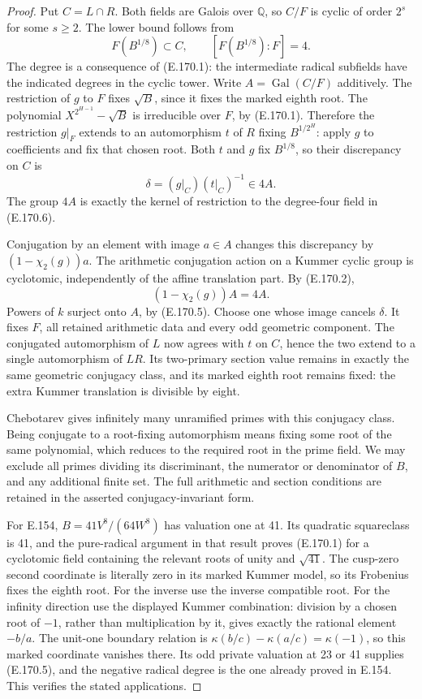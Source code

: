 \begin{proof}
Put \(C=L\cap R\). Both fields are Galois over \(\mathbb Q\),
so \(C/F\) is cyclic of order \(2^s\) for some \(s\ge2\).
The lower bound follows from
\[
          F(B^{1/8})\subset C,\qquad
          [F(B^{1/8}):F]=4.
 \tag{E.170.6}
\]
The degree is a consequence of (E.170.1): the intermediate
radical subfields have the indicated degrees in the cyclic tower.
Write \(A=\operatorname{Gal}(C/F)\) additively.
The restriction of \(g\) to \(F\) fixes \(\sqrt B\), since it
fixes the marked eighth root. The polynomial
\(X^{2^{H-1}}-\sqrt B\) is irreducible over \(F\), by
(E.170.1). Therefore the restriction \(g|_F\) extends to an
automorphism \(t\) of \(R\) fixing \(B^{1/2^H}\): apply
\(g\) to coefficients and fix that chosen root. Both \(t\)
and \(g\) fix \(B^{1/8}\), so their discrepancy on \(C\) is
\[
             \delta=(g|_C)(t|_C)^{-1}\in4A.
 \tag{E.170.7}
\]
The group \(4A\) is exactly the kernel of restriction to the
degree-four field in (E.170.6).

Conjugation by an element with image \(a\in A\) changes this
discrepancy by \((1-\chi_2(g))a\). The arithmetic conjugation
action on a Kummer cyclic group is cyclotomic, independently of
the affine translation part. By (E.170.2),
\[
                 (1-\chi_2(g))A=4A.
 \tag{E.170.8}
\]
Powers of \(k\) surject onto \(A\), by (E.170.5). Choose one
whose image cancels \(\delta\). It fixes \(F\), all retained
arithmetic data and every odd geometric component. The conjugated
automorphism of \(L\) now agrees with \(t\) on \(C\), hence
the two extend to a single automorphism of \(LR\). Its
two-primary section value remains in exactly the same geometric
conjugacy class, and its marked eighth root remains fixed: the
extra Kummer translation is divisible by eight.

Chebotarev \citep[Theorem~8.31, p.~147]{MilneANT2020} gives
infinitely many unramified primes with this conjugacy class.
Being conjugate to a root-fixing automorphism means fixing some
root of the same polynomial, which reduces to the required root
in the prime field. We may exclude all primes dividing its
discriminant, the numerator or denominator of \(B\), and any
additional finite set. The full arithmetic and section conditions
are retained in the asserted conjugacy-invariant form.

For E.154, \(B=41V^8/(64W^8)\) has valuation one at 41. Its
quadratic squareclass is 41, and the pure-radical argument in that
result proves (E.170.1) for a cyclotomic field containing the
relevant roots of unity and \(\sqrt{41}\). The cusp-zero second
coordinate is literally zero in its marked Kummer model, so its
Frobenius fixes the eighth root. For the inverse use the inverse
compatible root. For the infinity direction use the displayed
Kummer combination: division by a chosen root of \(-1\),
rather than multiplication by it, gives exactly the rational
element \(-b/a\). The unit-one boundary relation is
\(\kappa(b/c)-\kappa(a/c)=\kappa(-1)\), so this marked
coordinate vanishes there. Its odd private valuation at 23 or
41 supplies (E.170.5), and the negative radical degree is the
one already proved in E.154. This verifies the stated applications.


\end{proof}
